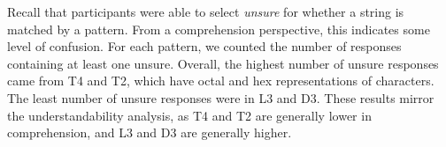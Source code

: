 Recall that participants were able to select \emph{unsure} for whether a string is matched  by a pattern.
From a comprehension perspective, this indicates some level of confusion.
For each pattern, we counted the number of responses containing at least one unsure.
Overall, the highest number of unsure responses came from T4 and T2, which have octal and hex representations of characters. The least number of unsure responses were in L3 and D3.
These results mirror the understandability analysis, as T4 and T2 are generally lower in comprehension, and L3 and D3 are generally higher.%

